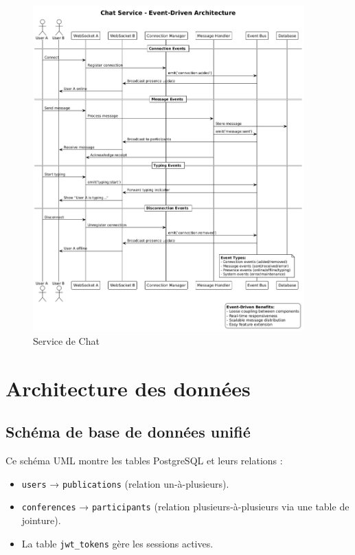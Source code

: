 \documentclass{rapportPfe}
\begin{document}
\begin{figure}[htbp]

    \includegraphics[width=0.93\textwidth]{diagrams/diagram4.png}
    \caption{Service de Chat}
    \label{fig:diagram4}
\end{figure}


\FloatBarrier

\section{Architecture des données}

\subsection{Schéma de base de données unifié}

Ce schéma UML montre les tables PostgreSQL et leurs relations :

\begin{itemize}
    \item \texttt{users} → \texttt{publications} (relation un-à-plusieurs).
    \item \texttt{conferences} → \texttt{participants} (relation plusieurs-à-plusieurs via une table de jointure).
    \item La table \texttt{jwt\_tokens} gère les sessions actives.
\end{itemize}
\end{document}
